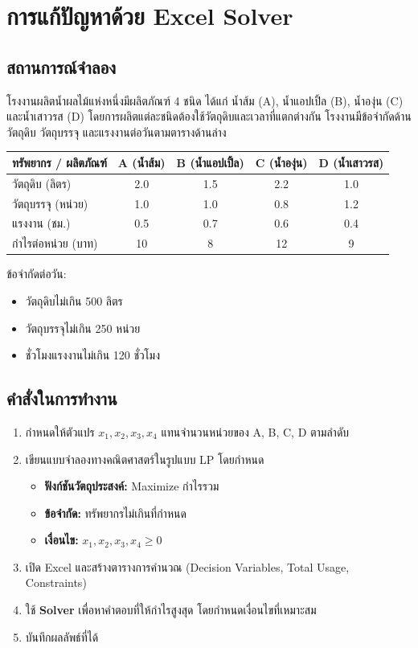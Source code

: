 \newpage
\section{การแก้ปัญหาด้วย Excel Solver}

\subsection*{สถานการณ์จำลอง}
โรงงานผลิตน้ำผลไม้แห่งหนึ่งมีผลิตภัณฑ์ 4 ชนิด ได้แก่ น้ำส้ม (A), น้ำแอปเปิ้ล (B), น้ำองุ่น (C) และน้ำเสาวรส (D) โดยการผลิตแต่ละชนิดต้องใช้วัตถุดิบและเวลาที่แตกต่างกัน โรงงานมีข้อจำกัดด้านวัตถุดิบ วัตถุบรรจุ และแรงงานต่อวันตามตารางด้านล่าง

\begin{center}
\begin{tabular}{lcccc}
\toprule
\textbf{ทรัพยากร / ผลิตภัณฑ์} & \textbf{A (น้ำส้ม)} & \textbf{B (น้ำแอปเปิ้ล)} & \textbf{C (น้ำองุ่น)} & \textbf{D (น้ำเสาวรส)} \\
\midrule
วัตถุดิบ (ลิตร) & 2.0 & 1.5 & 2.2 & 1.0 \\
วัตถุบรรจุ (หน่วย) & 1.0 & 1.0 & 0.8 & 1.2 \\
แรงงาน (ชม.) & 0.5 & 0.7 & 0.6 & 0.4 \\
กำไรต่อหน่วย (บาท) & 10 & 8 & 12 & 9 \\
\bottomrule
\end{tabular}
\end{center}

ข้อจำกัดต่อวัน:
\begin{itemize}
    \item วัตถุดิบไม่เกิน 500 ลิตร
    \item วัตถุบรรจุไม่เกิน 250 หน่วย
    \item ชั่วโมงแรงงานไม่เกิน 120 ชั่วโมง
\end{itemize}

\subsection*{คำสั่งในการทำงาน}
\begin{enumerate}[label=\arabic*.]
    \item กำหนดให้ตัวแปร $x_1, x_2, x_3, x_4$ แทนจำนวนหน่วยของ A, B, C, D ตามลำดับ
    \item เขียนแบบจำลองทางคณิตศาสตร์ในรูปแบบ LP โดยกำหนด
    \begin{itemize}
        \item \textbf{ฟังก์ชันวัตถุประสงค์:} Maximize กำไรรวม
        \item \textbf{ข้อจำกัด:} ทรัพยากรไม่เกินที่กำหนด
        \item \textbf{เงื่อนไข:} $x_1, x_2, x_3, x_4 \geq 0$
    \end{itemize}
    \item เปิด Excel และสร้างตารางการคำนวณ (Decision Variables, Total Usage, Constraints)
    \item ใช้ \textbf{Solver} เพื่อหาคำตอบที่ให้กำไรสูงสุด โดยกำหนดเงื่อนไขที่เหมาะสม
    \item บันทึกผลลัพธ์ที่ได้
\end{enumerate}

